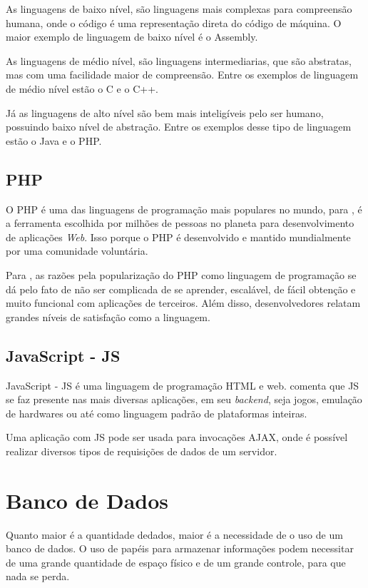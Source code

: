 As linguagens de baixo nível, são linguagens mais complexas para compreensão humana, onde o código é uma representação direta do código de máquina. O maior exemplo de linguagem de baixo nível é o Assembly.

As linguagens de médio nível, são linguagens intermediarias, que são abstratas, mas com uma facilidade maior de compreensão. Entre os exemplos de linguagem de médio nível estão o C e o C++.

Já as linguagens de alto nível são bem mais inteligíveis pelo ser humano, possuindo baixo nível de abstração. Entre os exemplos desse tipo de linguagem estão o Java e o PHP.

\subsection{PHP}
O PHP é uma das linguagens de programação mais populares no mundo, para \cite[p.2]{vaswani2010}, é a ferramenta  escolhida por milhões de pessoas no planeta para desenvolvimento de aplicações \textit{Web}. Isso porque o PHP é desenvolvido e mantido mundialmente por uma comunidade voluntária. 

Para \cite[p.2]{vaswani2010}, as razões pela popularização do PHP como linguagem de programação se dá pelo fato de não ser complicada de se aprender, escalável, de fácil obtenção e muito funcional com aplicações de terceiros. Além disso, desenvolvedores relatam grandes níveis de satisfação como a linguagem.

\subsection{JavaScript - JS}
JavaScript - JS é uma linguagem de programação HTML e web. \cite{balduino2014} comenta que JS se faz presente nas mais diversas aplicações, em seu \textit{backend}, seja jogos, emulação de hardwares ou até como linguagem padrão de plataformas inteiras.

Uma aplicação com JS pode ser usada para invocações AJAX, onde é possível realizar diversos tipos de requisições de dados de um servidor.

\section{Banco de Dados}
Quanto maior é a quantidade dedados, maior é a necessidade de o uso de um banco de dados. O uso de papéis para armazenar informações podem necessitar de uma grande quantidade de espaço físico e de um grande controle, para que nada se perda.

